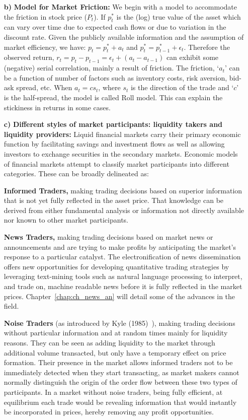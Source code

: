 \begin{enumerate}
\item[\textbf{b)}] \textbf{Model for Market Friction:} We begin with a model to accommodate the friction in stock price ($P_t$). If $p_t^*$ is the (log) true value of the asset which can vary over time due to expected cash flows or due to variation in the discount rate. Given the publicly available information and the assumption of market efficiency, we have: $p_t= p_t^* + a_t$ and $p_t^*= p_{t-1}^* + \epsilon_t$. Therefore the observed return, $r_t= p_t - p_{t-1}= \epsilon_t + (a_t - a_{t-1})$ can exhibit some (negative) serial correlation, mainly a result of friction. The friction, `$a_t$' can be a function of number of factors such as inventory costs, risk aversion, bid-ask spread, etc. When $a_t= c s_t$, where $s_t$ is the direction of the trade and `$c$' is the half-spread, the model is called Roll model. This can explain the stickiness in returns in some cases.  

\item[\textbf{c)}] \textbf{Different styles of market participants: liquidity takers and liquidity providers:} Liquid financial markets carry their primary economic function by facilitating savings and investment flows as well as allowing investors to exchange securities in the secondary markets. Economic models of financial markets attempt to classify market participants into different categories. These can be broadly delineated as: \twomedskip

\textbf{Informed Traders,} making trading decisions based on superior information that is not yet fully reflected in the asset price. That knowledge can be derived from either fundamental analysis or information not directly available nor known to other market participants. \twomedskip

\textbf{News Traders,} making trading decisions based on market news or announcements and are trying to make profits by anticipating the market's response to a particular catalyst. The electronification of news dissemination offers new opportunities for developing quantitative trading strategies by leveraging text-mining tools such as natural language processing to interpret, and trade on, machine readable news before it is fully reflected in the market prices. Chapter~\ref{chap:ch_news_an} will detail some of the advances in the field. \twomedskip

\textbf{Noise Traders} (as introduced by Kyle (1985)~\cite{kyle1985}), making trading decisions without particular information and at random times mainly for liquidity reasons. They can be seen as adding liquidity to the market through additional volume transacted, but only have a temporary effect on price formation. Their presence in the market allows informed traders not to be immediately detected when they start transacting, as market makers cannot normally distinguish the origin of the order flow between these two types of participants. In a market without noise traders, being fully efficient, at equilibrium each trade would be revealing information that would instantly be incorporated in prices, hereby removing any profit opportunities. \twomedskip


\end{enumerate}
